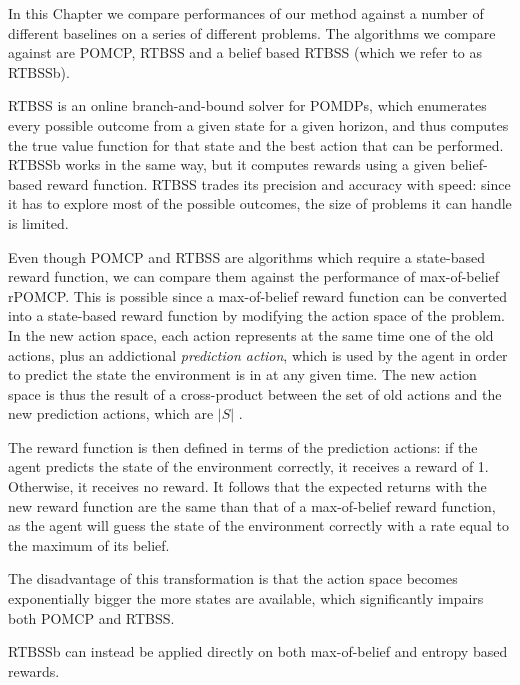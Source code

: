 In this Chapter we compare performances of our method against a number of different baselines on
a series of different problems. The algorithms we compare against are POMCP, RTBSS and a belief
based RTBSS (which we refer to as RTBSSb).

RTBSS is an online branch-and-bound solver for POMDPs, which enumerates every possible outcome from
a given state for a given horizon, and thus computes the true value function for that state and
the best action that can be performed. RTBSSb works in the same way, but it computes rewards using a
given belief-based reward function. RTBSS trades its precision and accuracy with speed: since it has
to explore most of the possible outcomes, the size of problems it can handle is limited.

Even though POMCP and RTBSS are algorithms which require a state-based reward function, we can
compare them against the performance of max-of-belief rPOMCP. This is possible since a max-of-belief
reward function can be converted into a state-based reward function by modifying the action space of
the problem. In the new action space, each action represents at the same time one of the old
actions, plus an addictional \textit{prediction action}, which is used by the agent in order to
predict the state the environment is in at any given time. The new action space is thus the result
of a cross-product between the set of old actions and the new prediction actions, which are $|S|$
\cite{cit:rpomdp}.

%

The reward function is then defined in terms of the prediction actions: if the agent predicts the
state of the environment correctly, it receives a reward of 1. Otherwise, it receives no reward. It
follows that the expected returns with the new reward function are the same than that of a
max-of-belief reward function, as the agent will guess the state of the environment correctly with a
rate equal to the maximum of its belief.

The disadvantage of this transformation is that the action space becomes exponentially bigger the
more states are available, which significantly impairs both POMCP and RTBSS.

RTBSSb can instead be applied directly on both max-of-belief and entropy based rewards.

